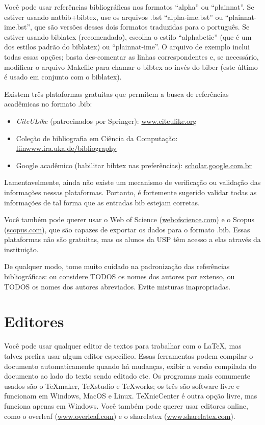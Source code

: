Você pode usar referências bibliográficas nos formatos ``alpha'' ou ``plainnat''.
Se estiver usando natbib+bibtex, use os arquivos .bst ``alpha-ime.bst'' ou
``plainnat-ime.bst'', que são versões desses dois formatos traduzidas para o
português. Se estiver usando biblatex (recomendado), escolha o estilo
``alphabetic'' (que é um dos estilos padrão do biblatex) ou ``plainnat-ime''.
O arquivo de exemplo inclui todas essas opções; basta des-comentar as linhas
correspondentes e, se necessário, modificar o arquivo Makefile para chamar
o bibtex ao invés do biber (este último é usado em conjunto com o biblatex).

Existem três plataformas gratuitas que permitem
a busca de referências acadêmicas no formato .bib:

\begin{itemize}
  \item \emph{CiteULike} (patrocinados por Springer): \url{www.citeulike.org}
  \item Coleção de bibliografia em Ciência da Computação: \url{liinwww.ira.uka.de/bibliography}
  \item Google acadêmico (habilitar bibtex nas preferências): \url{scholar.google.com.br}
\end{itemize}

Lamentavelmente, ainda não existe um mecanismo de verificação ou validação das
informações nessas plataformas. Portanto, é fortemente sugerido validar todas
as informações de tal forma que as entradas bib estejam corretas.

Você também pode querer usar o Web of Science (\url{webofscience.com})
e o Scopus (\url{scopus.com}), que são capazes de exportar os dados para
o formato .bib. Essas plataformas não são gratuitas, mas os alunos da USP
têm acesso a elas através da instituição.

De qualquer modo, tome muito cuidado na padronização das referências
bibliográficas: ou considere TODOS os nomes dos autores por extenso, ou TODOS
os nomes dos autores abreviados.  Evite misturas inapropriadas.

\section{Editores}

Você pode usar qualquer editor de textos para trabalhar com o \LaTeX{}, mas
talvez prefira usar algum editor específico. Essas ferramentas podem compilar
o documento automaticamente quando há mudanças, exibir a versão compilada
do documento ao lado do texto sendo editado etc. Os programas mais comumente
usados são o TeXmaker, TeXstudio e TeXworks; os três são software livre e
funcionam em Windows, MacOS e Linux. TeXnicCenter é outra opção livre, mas
funciona apenas em Windows. Você também pode querer usar editores online,
como o overleaf (\url{www.overleaf.com}) e o sharelatex (\url{www.sharelatex.com}).


